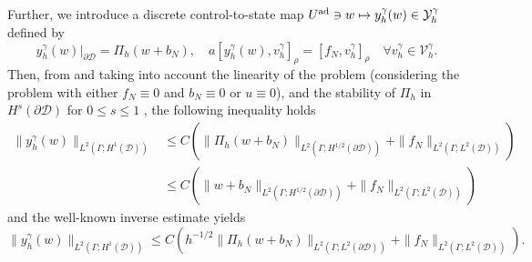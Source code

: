 \documentclass[a4paper,10pt]{article}
\newcommand{\cD}{{\mathcal{D}}}
\newcommand{\uL}{{L^2(\Gamma;L^2(\partial \cD))}}
\newcommand{\uH}{{L^2(\Gamma;H^{1/2}(\partial \cD))}}
\newcommand{\yL}{{L^2(\Gamma;L^2(\cD))}}
\newcommand{\yH}{{L^2(\Gamma;H^1(\cD))}}
\numberwithin{theorem}{section}
\begin{document}

\noindent Further, we introduce a discrete control-to-state map $U^{\textup{ad}} \ni w \mapsto y_h^{\gamma}(w) \in \mathcal{Y}_h^{\gamma}$ defined by
\begin{equation}\label{eqn:aux2}
  y_h^{\gamma}(w) |_{\partial\cD}= \Pi_{h}(w+b_{N}),\quad a[y_h^{\gamma}(w), v_h^\gamma]_{\rho} = [f_N,v_h^\gamma]_{\rho} \quad \forall v_h^\gamma \in \mathcal{V}_h^{\gamma}.
\end{equation}
Then, from \cite[Lemma~5.1]{ECasas_JPRaymond_2006b} and \cite[Theorem~2.3]{ECasas_JPRaymond_2006a} taking into account the linearity of the problem (considering the problem with either $f_N \equiv 0$ and $b_N \equiv 0$ or $u \equiv 0$), and the stability of $\Pi_h$ in $H^s(\partial \cD)$ for $0 \leq s \leq 1$  \cite{ECasas_JPRaymond_2006a},  the following inequality holds 
\begin{align}\label{ineq:yh_Piu}
  \|y_h^{\gamma}(w) \|_{\yH} &\le C \left( \|\Pi_h(w + b_{N})\|_{\uH} + \|f_N\|_{\yL}  \right) \nonumber \\
  &\le C \left( \|w + b_{N}\|_{\uH} + \|f_N\|_{\yL}  \right)
\end{align}
and the well-known inverse estimate \cite{MBerggren_2004a} yields
\begin{equation}\label{ineq:yh_Piu_inv}
    \|y_h^{\gamma}(w) \|_{\yH}  \leq C \left( h^{-1/2} \|\Pi_h(w + b_{N}) \|_{\uL}  + \|f_N\|_{\yL}  \right).
\end{equation}
\end{document}
